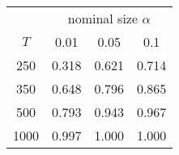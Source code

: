 % 
\begin{tabular}{cccc}
  \hline
  & \multicolumn{3}{c}{nominal size $\alpha$} \\
 $T$ & 0.01 & 0.05 & 0.1 \\
 \hline
250 & 0.318 & 0.621 & 0.714 \\ 
  350 & 0.648 & 0.796 & 0.865 \\ 
  500 & 0.793 & 0.943 & 0.967 \\ 
  1000 & 0.997 & 1.000 & 1.000 \\ 
   \hline
\end{tabular}
